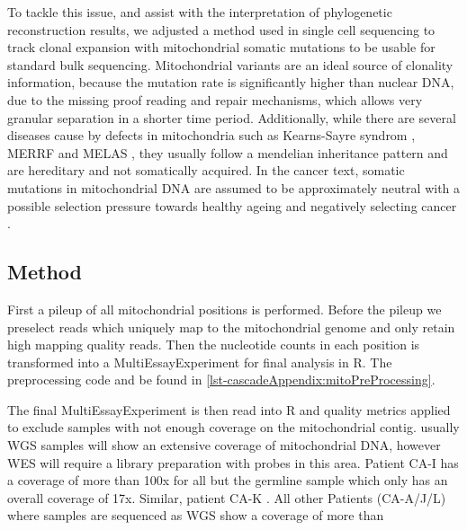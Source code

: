 To tackle this issue, and assist with the interpretation of phylogenetic reconstruction results, we adjusted a method used in single cell sequencing to track clonal expansion with mitochondrial somatic mutations \cite{Ludwig2019} to be usable for standard bulk sequencing. Mitochondrial variants are an ideal source of clonality information, because the mutation rate is significantly higher than nuclear DNA, due to the missing proof reading and repair mechanisms, which allows very granular separation in a shorter time period. Additionally, while there are several diseases cause by defects in mitochondria such as Kearns-Sayre syndrom \cite{Harvey1992}, MERRF \cite{Adam1993} and MELAS \cite{Hirano1992}, they usually follow a mendelian inheritance pattern and are hereditary and not somatically acquired. In the cancer text, somatic mutations in mitochondrial DNA are assumed to be approximately neutral with a possible selection pressure towards healthy ageing and negatively selecting cancer \cite{Rodell2013,Yuan2020}.

\subsection{Method}
\label{cascade-sec:mitoMethod}

First a pileup of all mitochondrial positions is performed. Before the pileup we preselect reads which uniquely map to the mitochondrial genome and only retain high mapping quality reads. Then the nucleotide counts in each position is transformed into a MultiEssayExperiment \cite{Ramos2017} for final analysis in R. The preprocessing code and be found in \autoref{lst-cascadeAppendix:mitoPreProcessing}.

The final MultiEssayExperiment is then read into R and quality metrics applied to exclude samples with not enough coverage on the mitochondrial contig. usually WGS samples will show an extensive coverage of mitochondrial DNA, however WES will require a library preparation with probes in this area. Patient CA-I has a coverage of more than 100x for all but the germline sample which only has an overall coverage of 17x. Similar, patient CA-K . All other Patients (CA-A/J/L) where samples are sequenced as WGS show a coverage of more than 

